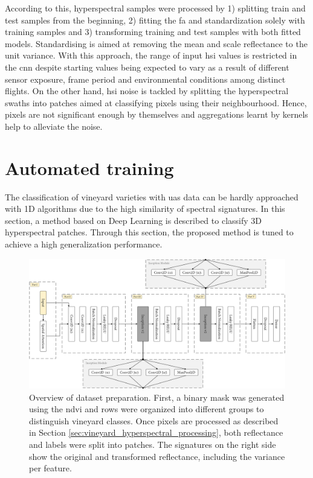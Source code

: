 According to this, hyperspectral samples were processed by 1) splitting train and test samples from the beginning, 2) fitting the \acrshort{fa} and standardization solely with training samples and 3) transforming training and test samples with both fitted models. Standardising is aimed at removing the mean and scale reflectance to the unit variance. With this approach, the range of input \acrshort{hsi} values is restricted in the \acrshort{cnn} despite starting values being expected to vary as a result of different sensor exposure, frame period and environmental conditions among distinct flights. On the other hand, \acrshort{hsi} noise is tackled by splitting the hyperspectral swaths into patches aimed at classifying pixels using their neighbourhood. Hence, pixels are not significant enough by themselves and aggregations learnt by kernels help to alleviate the noise.

\newpage
\section{Automated training}

The classification of vineyard varieties with \acrshort{uas} data can be hardly approached with 1D algorithms due to the high similarity of spectral signatures. In this section, a method based on Deep Learning is described to classify 3D hyperspectral patches. Through this section, the proposed method is tuned to achieve a high generalization performance. 

\begin{figure}[ht]
    \centering
    \includegraphics[width=\linewidth]{figs/vineyard_classification/network.png}
	\caption{Overview of dataset preparation. First, a binary mask was generated using the \acrshort{ndvi} and rows were organized into different groups to distinguish vineyard classes. Once pixels are processed as described in Section \ref{sec:vineyard_hyperspectral_processing}, both reflectance and labels were split into patches. The signatures on the right side show the original and transformed reflectance, including the variance per feature. }
	\label{fig:vineyard_cnn_network}
\end{figure}

